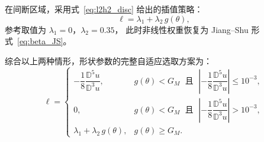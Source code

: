 \documentclass[12pt,a4paper]{article}
\numberwithin{equation}{section}    %
\begin{document}
在间断区域，采用式~\eqref{eq:l2h2_disc} 给出的插值策略：
\begin{equation}
    \label{eq:l2h2_disc}
    \ell = \lambda_1 + \lambda_2\,g(\theta),
\end{equation}
参考取值为 $\lambda_1 = 0$，$\lambda_2 = 0.35$，
此时非线性权重恢复为 Jiang--Shu 形式~\eqref{eq:beta_JS}。

综合以上两种情形，形状参数的完整自适应选取方案为：
\begin{equation}
    \label{eq:lambda_adaptive}
    \ell =
    \begin{cases}
        -\dfrac{1}{8}\dfrac{\mathbb{D}^5 u}{\mathbb{D}^3 u},
        & g(\theta) < G_M
          \;\text{ 且 }\;
          \left|-\dfrac{1}{8}\dfrac{\mathbb{D}^5 u}{\mathbb{D}^3 u}\right|
          \leqslant 10^{-3}, \\[10pt]
        0,
        & g(\theta) < G_M
          \;\text{ 且 }\;
          \left|-\dfrac{1}{8}\dfrac{\mathbb{D}^5 u}{\mathbb{D}^3 u}\right|
          > 10^{-3}, \\[10pt]
        \lambda_1 + \lambda_2\,g(\theta),
        & g(\theta) \geqslant G_M.
    \end{cases}
\end{equation}



\end{document}
